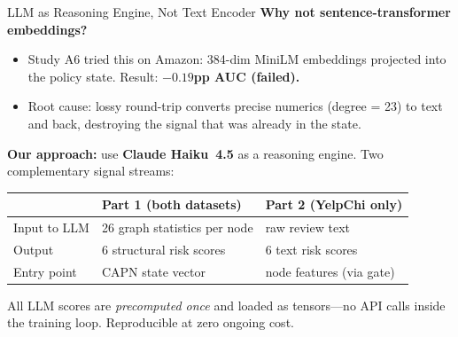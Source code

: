 \documentclass[aspectratio=169,10pt]{beamer}
\begin{document}
\begin{frame}{LLM as Reasoning Engine, Not Text Encoder}
    \textbf{Why not sentence-transformer embeddings?}
    \begin{itemize}
        \item Study A6 tried this on Amazon: 384-dim MiniLM embeddings projected into
              the policy state. Result: \textbf{$-0.19$pp AUC (failed).}
        \item Root cause: lossy round-trip converts precise numerics (degree = 23) to
              text and back, destroying the signal that was already in the state.
    \end{itemize}
    \vspace{0.5em}
    \textbf{Our approach:} use \textbf{Claude Haiku~4.5} as a reasoning engine.
    Two complementary signal streams:
    \begin{center}
    \begin{tabular}{@{}p{3.4cm}p{3cm}p{3.6cm}@{}}
        \toprule
        & \textbf{Part 1 (both datasets)} & \textbf{Part 2 (YelpChi only)} \\
        \midrule
        Input to LLM   & 26 graph statistics per node & raw review text \\
        Output         & 6 structural risk scores     & 6 text risk scores \\
        Entry point    & CAPN state vector            & node features (via gate) \\
        \bottomrule
    \end{tabular}
    \end{center}
    \vspace{0.3em}
    \footnotesize
    All LLM scores are \emph{precomputed once} and loaded as tensors---no API
    calls inside the training loop. Reproducible at zero ongoing cost.
\end{frame}
\end{document}

